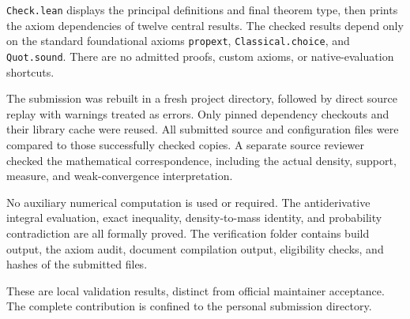 \documentclass[11pt]{article}
\begin{document}
\texttt{Check.lean} displays the principal definitions and final theorem type, then prints the axiom dependencies of twelve central results. The checked results depend only on the standard foundational axioms \texttt{propext}, \texttt{Classical.choice}, and \texttt{Quot.sound}. There are no admitted proofs, custom axioms, or native-evaluation shortcuts.

The submission was rebuilt in a fresh project directory, followed by direct source replay with warnings treated as errors. Only pinned dependency checkouts and their library cache were reused. All submitted source and configuration files were compared to those successfully checked copies. A separate source reviewer checked the mathematical correspondence, including the actual density, support, measure, and weak-convergence interpretation.

No auxiliary numerical computation is used or required. The antiderivative integral evaluation, exact inequality, density-to-mass identity, and probability contradiction are all formally proved. The verification folder contains build output, the axiom audit, document compilation output, eligibility checks, and hashes of the submitted files.

These are local validation results, distinct from official maintainer acceptance. The complete contribution is confined to the personal submission directory.
\end{document}
